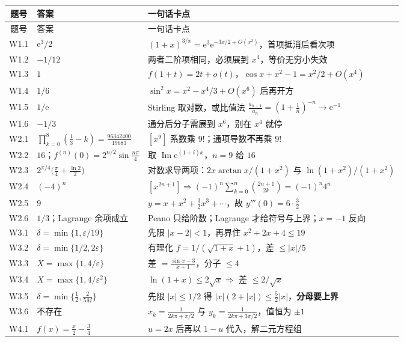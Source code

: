 \documentclass[11pt,a4paper]{ctexart}
\newcommand{\eps}{\varepsilon}
\newcommand{\ee}{\mathrm{e}}
\begin{document}
{\footnotesize
\begin{longtable}{@{}|c|p{5.0cm}|p{9.0cm}|@{}}
\hline
题号 & 答案 & 一句话卡点 \\
\hline
\endfirsthead
\hline
题号 & 答案 & 一句话卡点 \\
\hline
\endhead
\hline
\endfoot
W1.1 & $\ee^3/2$ & $(1+x)^{3/x}=\ee^3\ee^{-3x/2+O(x^2)}$，首项抵消后看次项 \\
W1.2 & $-1/12$ & 两者二阶项相同，必须展到 $x^4$，等价无穷小失效 \\
W1.3 & $1$ & $f(1+t)=2t+o(t)$，$\cos x+x^2-1=x^2/2+O(x^4)$ \\
W1.4 & $1/6$ & $\sin^2x=x^2-x^4/3+O(x^6)$ 后再开方 \\
W1.5 & $1/\ee$ & Stirling 取对数，或比值法 $\frac{a_{n+1}}{a_n}=(1+\frac1n)^{-n}\to\ee^{-1}$ \\
W1.6 & $-1/3$ & 通分后分子需展到 $x^6$，别在 $x^4$ 就停 \\
W2.1 & $\prod_{k=0}^{8}(\frac13-k)=\frac{96342400}{19683}$ & $[x^9]$ 系数乘 $9!$；通项导数\textbf{不}再乘 $9!$ \\
W2.2 & $16$；$f^{(n)}(0)=2^{n/2}\sin\frac{n\pi}{4}$ & 取 $\operatorname{Im}\ee^{(1+i)x}$，$n=9$ 给 $16$ \\
W2.3 & $2^{\pi/4}\big(\frac\pi4+\frac{\ln2}{2}\big)$ & 对数求导两项：$2x\arctan x/(1+x^2)$ 与 $\ln(1+x^2)/(1+x^2)$ \\
W2.4 & $(-4)^n$ & $[x^{2n+1}]\Rightarrow(-1)^n\sum_{k=0}^{n}\binom{2n+1}{2k}=(-1)^n4^n$ \\
W2.5 & $9$ & $y=x+x^2+\frac32x^3+\cdots$，故 $y'''(0)=6\cdot\frac32$ \\
W2.6 & $1/3$；Lagrange 余项成立 & Peano 只给阶数；Lagrange 才给符号与上界；$x=-1$ 反向 \\
W3.1 & $\delta=\min\{1,\eps/19\}$ & 先限 $|x-2|<1$，再界住 $x^2+2x+4\le19$ \\
W3.2 & $\delta=\min\{1/2,2\eps\}$ & 有理化 $f=1/(\sqrt{1+x}+1)$，差 $\le|x|/5$ \\
W3.3 & $X=\max\{1,4/\eps\}$ & 差 $=\frac{\sin x-3}{x+1}$，分子 $\le4$ \\
W3.4 & $X=\max\{1,4/\eps^2\}$ & $\ln(1+x)\le2\sqrt x\Rightarrow$ 差 $\le2/\sqrt x$ \\
W3.5 & $\delta=\min\{\frac12,\frac{2}{5M}\}$ & 先限 $|x|\le1/2$ 得 $|x|(2+|x|)\le\frac52|x|$，\textbf{分母要上界} \\
W3.6 & 不存在 & $x_k=\frac1{2k\pi+\pi/2}$ 与 $y_k=\frac1{2k\pi+3\pi/2}$，值恒为 $\pm1$ \\
W4.1 & $f(x)=\frac x2-\frac34$ & $u=2x$ 后再以 $1-u$ 代入，解二元方程组 \\

\end{longtable}}
\end{document}
